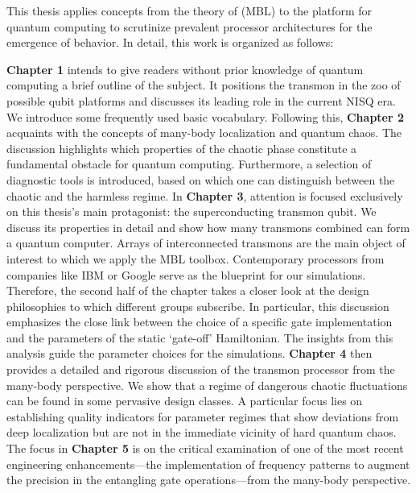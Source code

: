\renewcommand{\here}{partII_transmons/Auxiliary/}
This thesis applies concepts from the theory of  (MBL) to the  platform for quantum computing to scrutinize prevalent processor architectures for the emergence of  behavior. In detail, this work is organized as follows: 

\textbf{Chapter 1} intends to give readers without prior knowledge of quantum computing a brief outline of the subject. It positions the transmon in the zoo of possible qubit platforms and discusses its leading role in the current NISQ era. 
We introduce some frequently used basic vocabulary. Following this, \textbf{Chapter 2} acquaints with the concepts of many-body localization and quantum chaos. The discussion highlights which properties of the chaotic phase constitute a fundamental obstacle for quantum computing. 
Furthermore, a selection of diagnostic tools is introduced, based on which one can distinguish between the chaotic and the harmless regime.
In \textbf{Chapter 3}, attention is focused exclusively on this thesis's main protagonist: the superconducting transmon qubit. We discuss its properties in detail and show how many transmons combined can form a quantum computer.
Arrays of interconnected transmons are the main object of interest to which we apply the MBL toolbox.
Contemporary processors from companies like IBM or Google serve as the blueprint for our simulations. Therefore,
the second half of the chapter takes a closer look at the design philosophies to which different groups subscribe. In particular, this discussion emphasizes the close link between the choice of a specific gate implementation and the parameters of the static `gate-off' Hamiltonian.
The insights from this analysis guide the parameter choices for the simulations.
\textbf{Chapter 4} then provides a detailed and rigorous discussion of the transmon processor from the many-body perspective. We show that a regime of dangerous chaotic fluctuations can be found in some pervasive design classes. A particular focus lies on establishing quality indicators for parameter regimes that show deviations from deep localization but are not in the immediate vicinity of hard quantum chaos.
The focus in \textbf{Chapter 5} is on the critical examination of one of the most recent engineering enhancements---the implementation of frequency patterns to augment the precision in the entangling gate operations---from the many-body perspective.  
